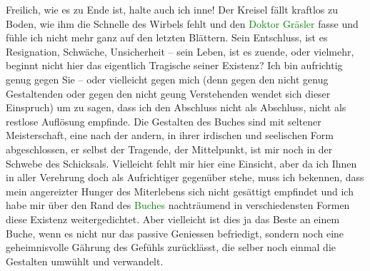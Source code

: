 \pstart
           Freilich, wie es zu Ende ist, halte auch ich inne! Der Kreisel fällt kraftlos zu
               Boden, wie ihm die Schnelle des Wirbels fehlt und den \textcolor{green}{Doktor Gräsler}\ledrightnote{{$\rightarrow$}\emph{\textcolor{green}{Doktor Gräsler, Badearzt}}} fasse und fühle ich nicht mehr ganz auf den
               letzten Blättern. Sein Entschluss, ist es Resignation, Schwäche, Unsicherheit – sein
               Leben, ist es zuende, oder vielmehr, beginnt nicht hier das eigentlich Tragische
               seiner Existenz? Ich bin aufrichtig genug gegen Sie – oder vielleicht gegen mich
               (denn gegen den nicht genug Gestaltenden oder gegen den nicht geung Verstehenden
               wendet sich dieser Einspruch) um zu sagen, dass ich den Abschluss nicht als
               Abschluss, nicht als restlose Auflösung empfinde. Die Gestalten des Buches sind mit
               seltener Meisterschaft, eine nach der andern, in ihrer irdischen und seelischen Form
               abgeschlossen, {\pb}er selbst der Tragende,
               der Mittelpunkt, ist mir noch in der Schwebe des Schicksals. Vielleicht fehlt mir
               hier eine Einsicht, aber da ich Ihnen in aller Verehrung doch als Aufrichtiger
               gegenüber stehe, muss ich bekennen, dass mein angereizter Hunger des Miterlebens sich
               nicht gesättigt empfindet und ich habe mir über den Rand des \textcolor{green}{Buches}\ledrightnote{{$\rightarrow$}\emph{\textcolor{green}{Doktor Gräsler, Badearzt}}} nachträumend in verschiedensten
               Formen diese Existenz weitergedichtet. Aber vielleicht ist dies ja das Beste an einem
               Buche, wenn es nicht nur das passive Geniessen befriedigt, sondern noch eine
               geheimnisvolle Gährung des Gefühls zurücklässt, die selber noch einmal die Gestalten
               umwühlt und verwandelt.\pend
           
